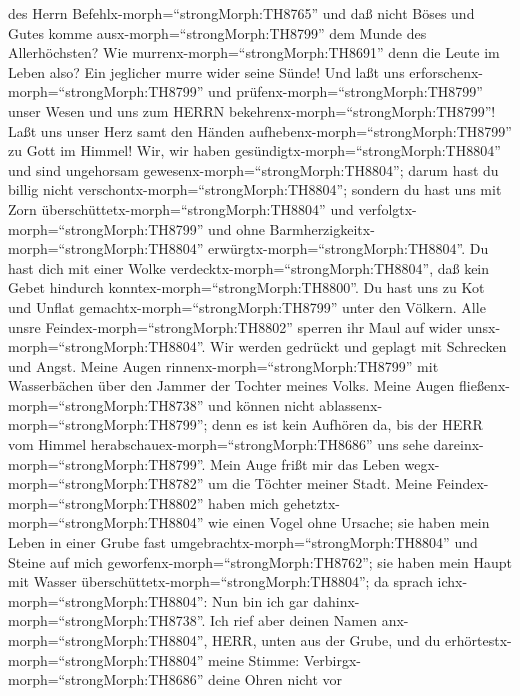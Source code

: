 des Herrn Befehlx-morph=``strongMorph:TH8765''  und daß
nicht Böses und Gutes komme ausx-morph=``strongMorph:TH8799'' dem Munde
des Allerhöchsten?  Wie
murrenx-morph=``strongMorph:TH8691'' denn die Leute im Leben also? Ein
jeglicher murre wider seine Sünde!  Und laßt uns
erforschenx-morph=``strongMorph:TH8799'' und
prüfenx-morph=``strongMorph:TH8799'' unser Wesen und uns zum HERRN
bekehrenx-morph=``strongMorph:TH8799''!  Laßt uns unser
Herz samt den Händen aufhebenx-morph=``strongMorph:TH8799'' zu Gott im
Himmel!  Wir, wir haben
gesündigtx-morph=``strongMorph:TH8804'' und sind ungehorsam
gewesenx-morph=``strongMorph:TH8804''; darum hast du billig nicht
verschontx-morph=``strongMorph:TH8804'';  sondern du hast
uns mit Zorn überschüttetx-morph=``strongMorph:TH8804'' und
verfolgtx-morph=``strongMorph:TH8799'' und ohne
Barmherzigkeitx-morph=``strongMorph:TH8804''
erwürgtx-morph=``strongMorph:TH8804''.  Du hast dich mit
einer Wolke verdecktx-morph=``strongMorph:TH8804'', daß kein Gebet
hindurch konntex-morph=``strongMorph:TH8800''.  Du hast uns
zu Kot und Unflat gemachtx-morph=``strongMorph:TH8799'' unter den
Völkern.  Alle unsre Feindex-morph=``strongMorph:TH8802''
sperren ihr Maul auf wider unsx-morph=``strongMorph:TH8804''.
 Wir werden gedrückt und geplagt mit Schrecken und Angst.
 Meine Augen rinnenx-morph=``strongMorph:TH8799'' mit
Wasserbächen über den Jammer der Tochter meines Volks. 
Meine Augen fließenx-morph=``strongMorph:TH8738'' und können nicht
ablassenx-morph=``strongMorph:TH8799''; denn es ist kein Aufhören da,
 bis der HERR vom Himmel
herabschauex-morph=``strongMorph:TH8686'' uns sehe
dareinx-morph=``strongMorph:TH8799''.  Mein Auge frißt mir
das Leben wegx-morph=``strongMorph:TH8782'' um die Töchter meiner Stadt.
 Meine Feindex-morph=``strongMorph:TH8802'' haben mich
gehetztx-morph=``strongMorph:TH8804'' wie einen Vogel ohne Ursache;
 sie haben mein Leben in einer Grube fast
umgebrachtx-morph=``strongMorph:TH8804'' und Steine auf mich
geworfenx-morph=``strongMorph:TH8762'';  sie haben mein
Haupt mit Wasser überschüttetx-morph=``strongMorph:TH8804''; da sprach
ichx-morph=``strongMorph:TH8804'': Nun bin ich gar
dahinx-morph=``strongMorph:TH8738''.  Ich rief aber deinen
Namen anx-morph=``strongMorph:TH8804'', HERR, unten aus der Grube,
 und du erhörtestx-morph=``strongMorph:TH8804'' meine
Stimme: Verbirgx-morph=``strongMorph:TH8686'' deine Ohren nicht vor

